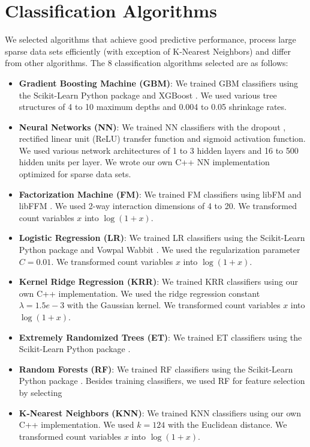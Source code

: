 \section{Classification Algorithms}
We selected algorithms that achieve good predictive performance, process large sparse data sets efficiently (with exception of K-Nearest Neighbors) and differ from other algorithms.  The 8 classification algorithms selected are as follows:
\begin{itemize}
\item \textbf{Gradient Boosting Machine (GBM)}: We trained GBM classifiers using the Scikit-Learn Python package \cite{scikit-learn} and XGBoost \cite{chen2015xgboost}.  We used various tree structures of 4 to 10 maximum depths and 0.004 to 0.05 shrinkage rates.
\item \textbf{Neural Networks (NN)}: We trained NN classifiers with the dropout \cite{srivastava2014dropout}, rectified linear unit (ReLU) \cite{dahl2013improving} transfer function and sigmoid activation function.  We used various network architectures of 1 to 3 hidden layers and 16 to 500 hidden units per layer.  We wrote our own C++ NN implementation optimized for sparse data sets.  
\item \textbf{Factorization Machine (FM)}: We trained FM classifiers using libFM \cite{rendle2012factorization} and libFFM \cite{libffm}.  We used 2-way interaction dimensions of 4 to 20.  We transformed count variables $x$ into $\log{(1 + x)}$.
\item \textbf{Logistic Regression (LR)}: We trained LR classifiers using the Scikit-Learn Python package \cite{scikit-learn} and Vowpal Wabbit \cite{langford2007vowpal}.  We used the regularization parameter $C=0.01$.  We transformed count variables $x$ into $\log{(1 + x)}$.
\item \textbf{Kernel Ridge Regression (KRR)}: We trained KRR classifiers using our own C++ implementation.  We used the ridge regression constant $\lambda=1.5e-3$ with the Gaussian kernel.  We transformed count variables $x$ into $\log{(1 + x)}$.
\item \textbf{Extremely Randomized Trees (ET)}: We trained ET classifiers using the Scikit-Learn Python package \cite{scikit-learn}.
\item \textbf{Random Forests (RF)}: We trained RF classifiers using the Scikit-Learn Python package \cite{scikit-learn}.  Besides training classifiers, we used RF for feature selection by selecting 
\item \textbf{K-Nearest Neighbors (KNN)}: We trained KNN classifiers using our own C++ implementation.  We used $k=124$ with the Euclidean distance.  We transformed count variables $x$ into $\log{(1 + x)}$.
\end{itemize}